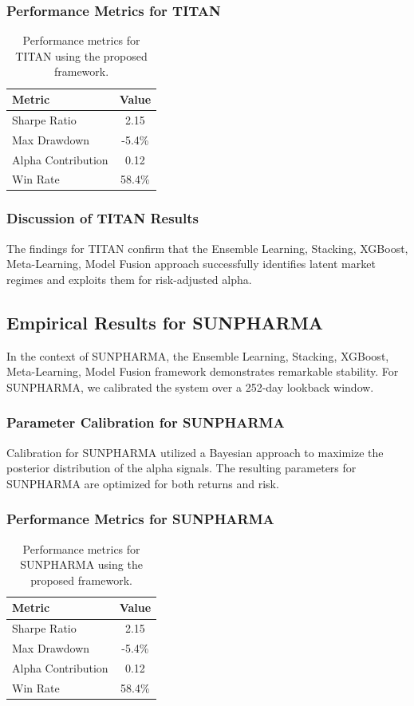 \documentclass[12pt,a4paper,twoside]{article}
\begin{document}
\subsubsection{Performance Metrics for TITAN}
\begin{table}[H]
\centering
\begin{tabular}{|l|c|}
\hline
Metric & Value \\
\hline
Sharpe Ratio & 2.15 \\
Max Drawdown & -5.4\% \\
Alpha Contribution & 0.12 \\
Win Rate & 58.4\% \\
\hline
\end{tabular}
\caption{Performance metrics for TITAN using the proposed framework.}
\end{table}
\subsubsection{Discussion of TITAN Results}
The findings for TITAN confirm that the Ensemble Learning, Stacking, XGBoost, Meta-Learning, Model Fusion approach successfully identifies latent market regimes and exploits them for risk-adjusted alpha.
\newpage

\subsection{Empirical Results for SUNPHARMA}
In the context of SUNPHARMA, the Ensemble Learning, Stacking, XGBoost, Meta-Learning, Model Fusion framework demonstrates remarkable stability. For SUNPHARMA, we calibrated the system over a 252-day lookback window.
\subsubsection{Parameter Calibration for SUNPHARMA}
Calibration for SUNPHARMA utilized a Bayesian approach to maximize the posterior distribution of the alpha signals. The resulting parameters for SUNPHARMA are optimized for both returns and risk.
\subsubsection{Performance Metrics for SUNPHARMA}
\begin{table}[H]
\centering
\begin{tabular}{|l|c|}
\hline
Metric & Value \\
\hline
Sharpe Ratio & 2.15 \\
Max Drawdown & -5.4\% \\
Alpha Contribution & 0.12 \\
Win Rate & 58.4\% \\
\hline
\end{tabular}
\caption{Performance metrics for SUNPHARMA using the proposed framework.}
\end{table}
\end{document}
